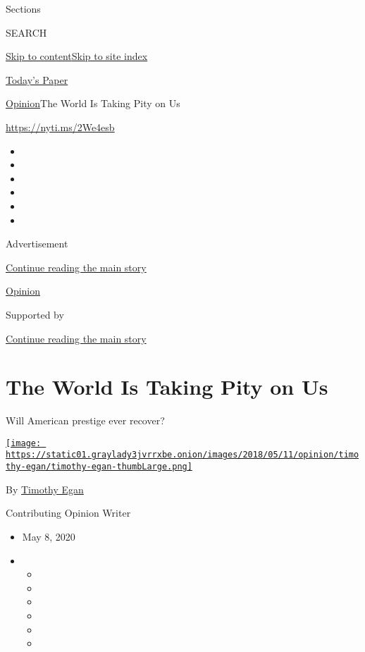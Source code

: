 Sections

SEARCH

\protect\hyperlink{site-content}{Skip to
content}\protect\hyperlink{site-index}{Skip to site index}

\href{https://myaccount.nytimes3xbfgragh.onion/auth/login?response_type=cookie\&client_id=vi}{}

\href{https://www.nytimes3xbfgragh.onion/section/todayspaper}{Today's
Paper}

\href{/section/opinion}{Opinion}\textbar{}The World Is Taking Pity on Us

\url{https://nyti.ms/2We4esb}

\begin{itemize}
\item
\item
\item
\item
\item
\item
\end{itemize}

Advertisement

\protect\hyperlink{after-top}{Continue reading the main story}

\href{/section/opinion}{Opinion}

Supported by

\protect\hyperlink{after-sponsor}{Continue reading the main story}

\hypertarget{the-world-is-taking-pity-on-us}{%
\section{The World Is Taking Pity on
Us}\label{the-world-is-taking-pity-on-us}}

Will American prestige ever recover?

\href{https://www.nytimes3xbfgragh.onion/by/timothy-egan}{\texttt{[image: https://static01.graylady3jvrrxbe.onion/images/2018/05/11/opinion/timothy-egan/timothy-egan-thumbLarge.png]}}

By \href{https://www.nytimes3xbfgragh.onion/by/timothy-egan}{Timothy
Egan}

Contributing Opinion Writer

\begin{itemize}
\item
  May 8, 2020
\item
  \begin{itemize}
  \item
  \item
  \item
  \item
  \item
  \item
  \end{itemize}
\end{itemize}


